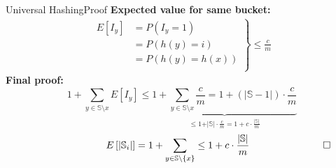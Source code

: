 \begin{frame}{Universal Hashing}{Proof}
  \textbf{Expected value for same bucket:}
  {\color{Mittel-Blau}
  \begin{align*}
    \left.\begin{array}{rl}
      E[I_y] & = P(I_y = 1)\\
      {} & = P(h(y) = i)\\
      {} & = P(h(y) = h(x))\\
    \end{array}\right\rbrace
    \leq \frac{c}{m}
  \end{align*}}
  \textbf{Final proof:}
  {\color{Mittel-Blau}
  \begin{displaymath}
    1 + \sum_{y \in \mathbb{S} \setminus x} E[I_y]
    \leq
    \underbrace{
      1 + \sum_{y \in \mathbb{S} \setminus x} \frac{c}{m}
        = 1 + \left(\vert \mathbb{S} - 1 \vert \right) \cdot \frac{c}{m}
    }_{
      \displaystyle \leq 1 + \vert \mathbb{S} \vert \cdot \frac{c}{m}
        = 1 + c \cdot \frac{\vert \mathbb{S} \vert}{m}
    }
  \end{displaymath}
  \begin{displaymath}
    \hspace*{7.5em}
    E\left[\vert \mathbb{S}_i \vert\right]
      = 1 + \sum_{y \in \mathbb{S} \setminus \{x\}}
      \leq 1 + c \cdot \frac{\vert \mathbb{S} \vert}{m}
    \hspace*{7.5em}\square
  \end{displaymath}}
\end{frame}
